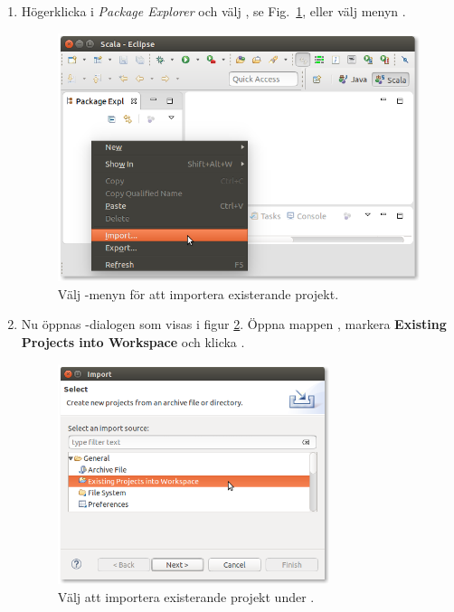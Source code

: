 \begin{enumerate}
\item Högerklicka i \textit{Package Explorer} och välj , se Fig.~\ref{fig:eclipse:import}, eller välj menyn . 

\begin{figure}[H]
\centering
\includegraphics[width=1.0\textwidth]{../img/eclipse/eclipse-import.png} 
\caption {Välj -menyn för att importera existerande projekt.}
\label{fig:eclipse:import}
\end{figure}

\item Nu öppnas -dialogen som visas i figur \ref{fig:eclipse:import-existing}. Öppna mappen , markera \textbf{Existing Projects into Workspace} och klicka .



\begin{figure}[H]
\centering
\includegraphics[width=0.75\textwidth]{../img/eclipse/eclipse-import-existing.png} 
\caption {Välj att importera existerande projekt under .}
\label{fig:eclipse:import-existing}
\end{figure}



\end{enumerate}
